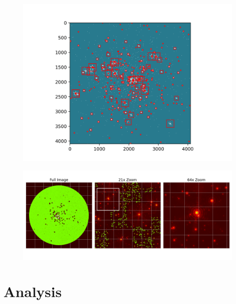 \documentclass{beamer}
\begin{document}
\begin{frame}
\begin{figure}
\centering
\includegraphics[width=\textwidth,height=\textheight,keepaspectratio]{Images/masking.png}
\end{figure}
\end{frame}


\begin{frame}
\begin{figure}
\centering
\includegraphics[width=\textwidth,height=\textheight,keepaspectratio]{Images/fits_extracted.png}
\end{figure}
\end{frame}

\section{Analysis}
\end{document}
